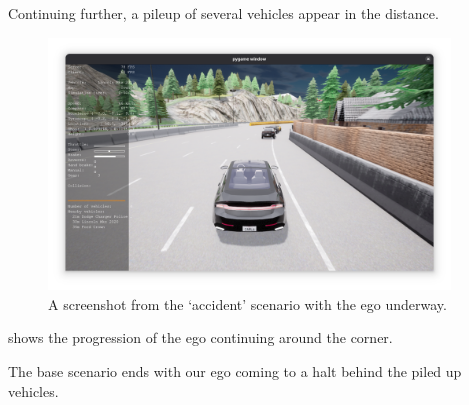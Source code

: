 Continuing further, a pileup of several vehicles appear in the distance.

\begin{figure}[htb]
    \centering
    \includegraphics[width=0.95\textwidth]{experiment-material/accident-pics/base/underway.png}
    \caption{A screenshot from the `accident' scenario with the ego underway.}\label{fig:accidentBaseUnderway}
\end{figure}

 shows the progression of the ego continuing around the corner.

The base scenario ends with our ego coming to a halt behind the piled up vehicles.


